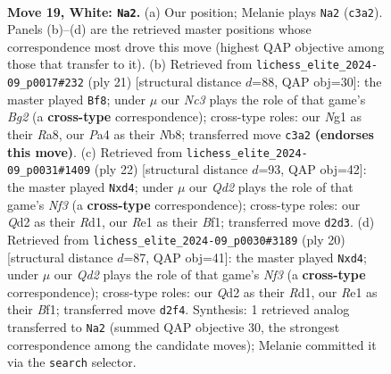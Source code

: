 \documentclass[11pt]{article}
\begin{document}
\clearpage

\begin{figure}[p]\centering
\begin{subfigure}{0.46\textwidth}\centering
\resizebox{\linewidth}{!}{%
\newchessgame
\chessboard[
  setfen={rnb1r3/3nq1kp/pp2p1p1/2p1P3/P2p4/2N5/1PPQ1PPP/1K2RBNR w - - 0 19},
  showmover=false,
  pgfstyle=straightmove, color=movearrow, markmove={c3-a2}
]}
\caption{}
\end{subfigure}\hfill
\begin{subfigure}{0.46\textwidth}\centering
\resizebox{\linewidth}{!}{%
\newchessgame
\chessboard[
  setfen={rnbqr1k1/1p2p1bp/2p2Ppn/3p4/p7/P2P1NP1/1PP1QPBP/RNB1R1K1 b - - 0 11},
  showmover=false,
  pgfstyle=straightmove, color=movearrow, markmove={g7-f8}
]}
\caption{}
\end{subfigure}
\\[4pt]
\begin{subfigure}{0.46\textwidth}\centering
\resizebox{\linewidth}{!}{%
\newchessgame
\chessboard[
  setfen={r1b1k2r/1p1nqp1p/2pp1npQ/p7/P2pP3/2N2N2/1PP2PPP/2KR1B1R w kq - 0 12},
  showmover=false,
  pgfstyle=straightmove, color=movearrow, markmove={f3-d4}
]}
\caption{}
\end{subfigure}\hfill
\begin{subfigure}{0.46\textwidth}\centering
\resizebox{\linewidth}{!}{%
\newchessgame
\chessboard[
  setfen={r1b1k2r/pp1nqp1p/2pp1npQ/8/P2pP3/2N2N2/1PP2PPP/2KR1B1R w kq - 0 11},
  showmover=false,
  pgfstyle=straightmove, color=movearrow, markmove={f3-d4}
]}
\caption{}
\end{subfigure}
\caption{\textbf{Move 19, White: \texttt{Na2}.} (a) Our position; Melanie plays \texttt{Na2} (\texttt{c3a2}). Panels (b)--(d) are the retrieved master positions whose correspondence most drove this move (highest QAP objective among those that transfer to it). (b) Retrieved from \texttt{lichess\_elite\_2024-09\_p0017\#232} (ply 21) [structural distance $d$=88, QAP obj=30]: the master played \texttt{Bf8}; under $\mu$ our \emph{Nc3} plays the role of that game's \emph{Bg2} (a \textbf{cross-type} correspondence); cross-type roles: our \emph{N}g1 as their \emph{R}a8, our \emph{P}a4 as their \emph{N}b8; transferred move \texttt{c3a2} \textbf{(endorses this move)}. (c) Retrieved from \texttt{lichess\_elite\_2024-09\_p0031\#1409} (ply 22) [structural distance $d$=93, QAP obj=42]: the master played \texttt{Nxd4}; under $\mu$ our \emph{Qd2} plays the role of that game's \emph{Nf3} (a \textbf{cross-type} correspondence); cross-type roles: our \emph{Q}d2 as their \emph{R}d1, our \emph{R}e1 as their \emph{B}f1; transferred move \texttt{d2d3}. (d) Retrieved from \texttt{lichess\_elite\_2024-09\_p0030\#3189} (ply 20) [structural distance $d$=87, QAP obj=41]: the master played \texttt{Nxd4}; under $\mu$ our \emph{Qd2} plays the role of that game's \emph{Nf3} (a \textbf{cross-type} correspondence); cross-type roles: our \emph{Q}d2 as their \emph{R}d1, our \emph{R}e1 as their \emph{B}f1; transferred move \texttt{d2f4}. Synthesis: 1 retrieved analog transferred to \texttt{Na2} (summed QAP objective 30, the strongest correspondence among the candidate moves); Melanie committed it via the \texttt{search} selector.}
\label{fig:thought-m36}
\end{figure}
\end{document}
